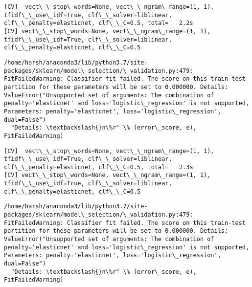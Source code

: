 \documentclass[11pt]{article}
\begin{document}
    \begin{Verbatim}[commandchars=\\\{\}]
[CV]  vect\_\_stop\_words=None, vect\_\_ngram\_range=(1, 1), tfidf\_\_use\_idf=True, clf\_\_solver=liblinear, clf\_\_penalty=elasticnet, clf\_\_C=0.5, total=   2.2s
[CV] vect\_\_stop\_words=None, vect\_\_ngram\_range=(1, 1), tfidf\_\_use\_idf=True, clf\_\_solver=liblinear, clf\_\_penalty=elasticnet, clf\_\_C=0.5 

    \end{Verbatim}

    \begin{Verbatim}[commandchars=\\\{\}]
/home/harsh/anaconda3/lib/python3.7/site-packages/sklearn/model\_selection/\_validation.py:479: FitFailedWarning: Classifier fit failed. The score on this train-test partition for these parameters will be set to 0.000000. Details: 
ValueError("Unsupported set of arguments: The combination of penalty='elasticnet' and loss='logistic\_regression' is not supported, Parameters: penalty='elasticnet', loss='logistic\_regression', dual=False")
  "Details: \textbackslash{}n\%r" \% (error\_score, e), FitFailedWarning)

    \end{Verbatim}

    \begin{Verbatim}[commandchars=\\\{\}]
[CV]  vect\_\_stop\_words=None, vect\_\_ngram\_range=(1, 1), tfidf\_\_use\_idf=True, clf\_\_solver=liblinear, clf\_\_penalty=elasticnet, clf\_\_C=0.5, total=   2.3s
[CV] vect\_\_stop\_words=None, vect\_\_ngram\_range=(1, 1), tfidf\_\_use\_idf=True, clf\_\_solver=liblinear, clf\_\_penalty=elasticnet, clf\_\_C=0.5 

    \end{Verbatim}

    \begin{Verbatim}[commandchars=\\\{\}]
/home/harsh/anaconda3/lib/python3.7/site-packages/sklearn/model\_selection/\_validation.py:479: FitFailedWarning: Classifier fit failed. The score on this train-test partition for these parameters will be set to 0.000000. Details: 
ValueError("Unsupported set of arguments: The combination of penalty='elasticnet' and loss='logistic\_regression' is not supported, Parameters: penalty='elasticnet', loss='logistic\_regression', dual=False")
  "Details: \textbackslash{}n\%r" \% (error\_score, e), FitFailedWarning)

    \end{Verbatim}
\end{document}
